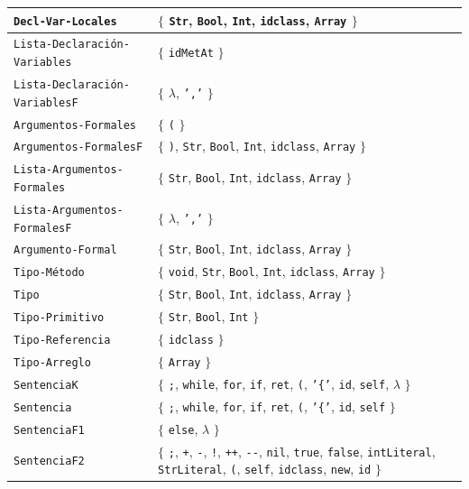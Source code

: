 \begin{longtable}{|
>{\raggedright\arraybackslash}p{}|
>{\raggedright\arraybackslash}p{}|}
\texttt{Decl-Var-Locales} & \(\{\) \texttt{Str}, \texttt{Bool}, \texttt{Int}, \texttt{idclass}, \texttt{Array} \(\}\) \\ \hline
\texttt{Lista-Declaración-Variables} & \(\{\) \texttt{idMetAt} \(\}\) \\ \hline
\texttt{Lista-Declaración-VariablesF} & \(\{\) \(\lambda\), \texttt{','} \(\}\) \\ \hline
\texttt{Argumentos-Formales} & \(\{\) \texttt{(} \(\}\) \\ \hline
\texttt{Argumentos-FormalesF} & \(\{\) \texttt{)}, \texttt{Str}, \texttt{Bool}, \texttt{Int}, \texttt{idclass}, \texttt{Array} \(\}\) \\ \hline
\texttt{Lista-Argumentos-Formales} & \(\{\) \texttt{Str}, \texttt{Bool}, \texttt{Int}, \texttt{idclass}, \texttt{Array} \(\}\) \\ \hline
\texttt{Lista-Argumentos-FormalesF} & \(\{\) \(\lambda\), \texttt{','} \(\}\) \\ \hline
\texttt{Argumento-Formal} & \(\{\) \texttt{Str}, \texttt{Bool}, \texttt{Int}, \texttt{idclass}, \texttt{Array} \(\}\) \\ \hline
\texttt{Tipo-Método} & \(\{\) \texttt{void}, \texttt{Str}, \texttt{Bool}, \texttt{Int}, \texttt{idclass}, \texttt{Array} \(\}\) \\ \hline
\texttt{Tipo} & \(\{\) \texttt{Str}, \texttt{Bool}, \texttt{Int}, \texttt{idclass}, \texttt{Array} \(\}\) \\ \hline
\texttt{Tipo-Primitivo} & \(\{\) \texttt{Str}, \texttt{Bool}, \texttt{Int} \(\}\) \\ \hline
\texttt{Tipo-Referencia} & \(\{\) \texttt{idclass} \(\}\) \\ \hline
\texttt{Tipo-Arreglo} & \(\{\) \texttt{Array} \(\}\) \\ \hline
\texttt{SentenciaK} & \(\{\) \texttt{;}, \texttt{while}, \texttt{for}, \texttt{if}, \texttt{ret}, \texttt{(}, \texttt{'\{'}, \texttt{id}, \texttt{self}, \(\lambda\) \(\}\) \\ \hline
\texttt{Sentencia} & \(\{\) \texttt{;}, \texttt{while}, \texttt{for}, \texttt{if}, \texttt{ret}, \texttt{(}, \texttt{'\{'}, \texttt{id}, \texttt{self} \(\}\) \\ \hline
\texttt{SentenciaF1} & \(\{\) \texttt{else}, \(\lambda\) \(\}\) \\ \hline
\texttt{SentenciaF2} & \(\{\) \texttt{;}, \texttt{+}, \texttt{-}, \texttt{!}, \texttt{++}, \texttt{-{}-}, \texttt{nil}, \texttt{true}, \texttt{false}, \texttt{intLiteral}, \texttt{StrLiteral}, \texttt{(}, \texttt{self}, \texttt{idclass}, \texttt{new}, \texttt{id} \(\}\) \\ \hline

\end{longtable}
